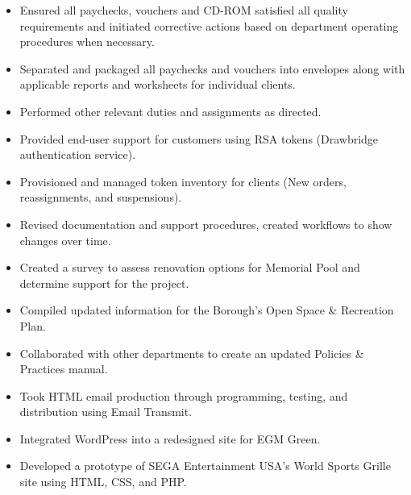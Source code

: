 \documentclass[letterpaper,12pt]{article}
\begin{document}
%
\begin{itemize}[nosep]
  \item
  Ensured all paychecks, vouchers and CD-ROM satisfied all quality requirements and initiated corrective actions based on department operating procedures when necessary.
\item
  Separated and packaged all paychecks and vouchers into envelopes along with applicable reports and worksheets for individual clients.
\item
  Performed other relevant duties and assignments as directed.
\end{itemize}
%
\begin{itemize}[nosep]
  \item
  Provided end-user support for customers using RSA tokens (Drawbridge authentication service).
  \item
  Provisioned and managed token inventory for clients (New orders, reassignments, and suspensions).
  \item
  Revised documentation and support procedures, created workflows to show changes over time.
\end{itemize}
%
\begin{itemize}[nosep]
  \item
  Created a survey to assess renovation options for Memorial Pool and determine support for the project.
  \item
  Compiled updated information for the Borough’s Open Space \& Recreation Plan.
  \item
  Collaborated with other departments to create an updated Policies \&
  Practices manual.
\end{itemize}
%
\begin{itemize}[nosep]
  \item
  Took HTML email production through programming, testing, and distribution using Email Transmit.
\item
  Integrated WordPress into a redesigned site for EGM Green.
\item
  Developed a prototype of SEGA Entertainment USA’s World Sports Grille site using HTML, CSS, and PHP.
\end{itemize}
\end{document}
